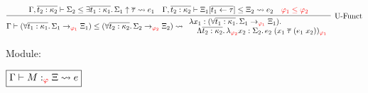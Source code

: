 \begin{gather*}
  \infer[\text{U-Funct}]{
    \Gamma \vdash (\forall \overline{t_1: \kappa_1}\ldotp \Sigma_1 \to_{\textcolor{red}{\varphi_1}} \Xi_1) \leq (\forall \overline{t_2: \kappa_2}\ldotp \Sigma_2 \to_{\textcolor{red}{\varphi_2}} \Xi_2) \elaborate
    \begin{array}{l}
      \lambda x_1: (\forall \overline{t_1: \kappa_1}\ldotp \Sigma_1 \to_{\textcolor{red}{\varphi_1}} \Xi_1)\ldotp \\
      \hspace{1em}\Lambda \overline{t_2: \kappa_2}\ldotp \lambda_{\textcolor{red}{\varphi_2}} x_2: \Sigma_2\ldotp
      e_2\; (x_1\; \overline{\tau}\; (e_1\; x_2))_{\textcolor{red}{\varphi_1}}
    \end{array}
  }{
    \Gamma, \overline{t_2: \kappa_2} \vdash \Sigma_2 \leq \exists \overline{t_1: \kappa_1}\ldotp \Sigma_1 \uparrow \overline{\tau} \elaborate e_1
    &
    \Gamma, \overline{t_2: \kappa_2} \vdash \Xi_1[\overline{t_1 \assign \tau}] \leq \Xi_2 \elaborate e_2
    &
    \textcolor{red}{\varphi_1 \leq \varphi_2}
  }
\end{gather*}

Module:

$\fbox{$\Gamma \vdash M:_{\textcolor{red}{\varphi}} \Xi \rightsquigarrow e$}$

